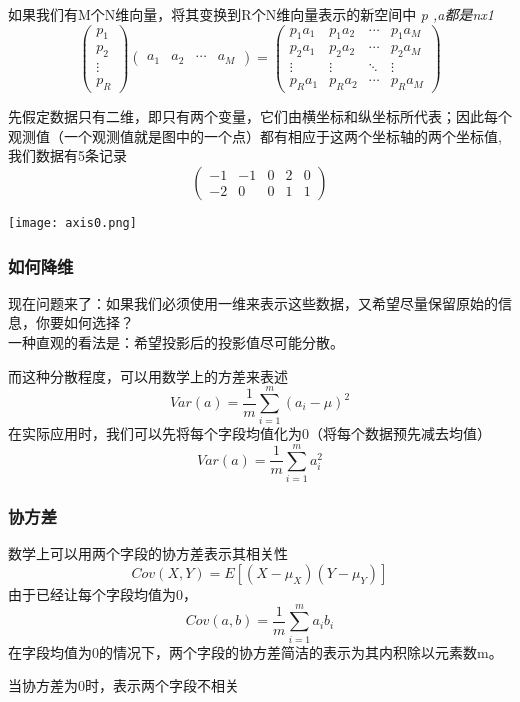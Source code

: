  \begin{frame}
 如果我们有M个N维向量，将其变换到R个N维向量表示的新空间中
 \it{p ,a}都是nx1\\
 \[\begin{pmatrix}
  p_1 \\
  p_2 \\
  \vdots \\
  p_R
\end{pmatrix}
\begin{pmatrix}
  a_1 & a_2 & \cdots & a_M
\end{pmatrix}
=
\begin{pmatrix}
  p_1a_1 &  p_1a_2 & \cdots & p_1a_M \\
  p_2a_1 &  p_2a_2 & \cdots &p_2a_M \\
  \vdots  &  \vdots  & \ddots & \vdots \\
  p_Ra_1 & p_Ra_2 & \cdots & p_Ra_M
\end{pmatrix}\]
 \end{frame}
 
 \begin{frame}
 先假定数据只有二维，即只有两个变量，它们由横坐标和纵坐标所代表；因此每个观测值（一个观测值就是图中的一个点）都有相应于这两个坐标轴的两个坐标值,
 我们数据有5条记录
 \[\begin{pmatrix}
  -1 & -1 & 0 & 2 & 0 \\
  -2 & 0 & 0 & 1 & 1
\end{pmatrix}\]
\begin{center}
\texttt{[image: axis0.png]}
\end{center}
 \end{frame}
 
 \begin{frame}
 \frametitle{如何降维}
 现在问题来了：如果我们必须使用一维来表示这些数据，又希望尽量保留原始的信息，你要如何选择？\\
一种直观的看法是：希望投影后的投影值尽可能分散。
  \end{frame}
  
  
  \begin{frame}
  而这种分散程度，可以用数学上的方差来表述
  $$Var(a)=\frac{1}{m}\sum_{i=1}^m{(a_i-\mu)^2}$$
  在实际应用时，我们可以先将每个字段均值化为0（将每个数据预先减去均值）
  $$Var(a)=\frac{1}{m}\sum_{i=1}^m{a_i^2}$$
  \end{frame}
  
  
  
  \begin{frame}
  \frametitle{协方差}
  数学上可以用两个字段的协方差表示其相关性
  $$Cov(X, Y) = E[(X - \mu_X)(Y - \mu_Y)]$$
  由于已经让每个字段均值为0，\\
  $$Cov(a,b)=\frac{1}{m}\sum_{i=1}^m{a_ib_i}$$
  在字段均值为0的情况下，两个字段的协方差简洁的表示为其内积除以元素数m。

当协方差为0时，表示两个字段不相关
  \end{frame}
  
